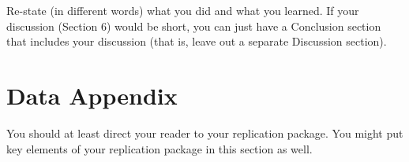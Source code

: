 \documentclass[12pt]{article}
\begin{document}
 
Re-state (in different words) what you did and what you learned. If your discussion (Section 6) would be short, you can just have a Conclusion section that includes your discussion (that is, leave out a separate Discussion section).

\newpage
\singlespacing
\setlength\bibsep{0pt}





\newpage
\section*{Data Appendix} \label{sec:appendixa}

You should at least direct your reader to your replication package. You might put key elements of your replication package in this section as well.
\end{document}
